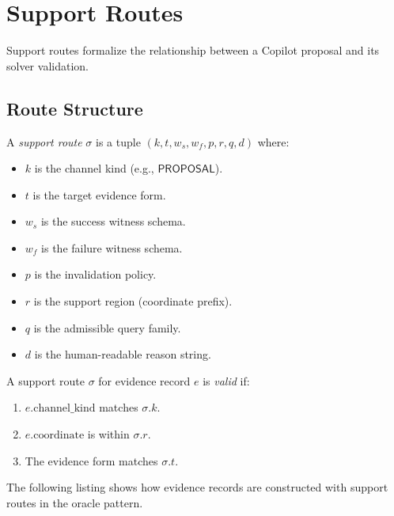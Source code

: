 \documentclass[11pt]{article}
\begin{document}
\section{Support Routes}
\label{sec:routes}

Support routes formalize the relationship between a Copilot
proposal and its solver validation.

\subsection{Route Structure}
\label{sec:routes:structure}

\begin{definition}
\label{def:support-route}
A \emph{support route} $\sigma$ is a tuple
$(k, t, w_s, w_f, p, r, q, d)$ where:
\begin{itemize}[leftmargin=2em]
\item $k$ is the channel kind (e.g., $\mathsf{PROPOSAL}$).
\item $t$ is the target evidence form.
\item $w_s$ is the success witness schema.
\item $w_f$ is the failure witness schema.
\item $p$ is the invalidation policy.
\item $r$ is the support region (coordinate prefix).
\item $q$ is the admissible query family.
\item $d$ is the human-readable reason string.
\end{itemize}
\end{definition}

\begin{definition}
\label{def:route-valid}
A support route $\sigma$ for evidence record $e$ is \emph{valid}
if:
\begin{enumerate}
\item $e.\mathrm{channel\_kind}$ matches $\sigma.k$.
\item $e.\mathrm{coordinate}$ is within $\sigma.r$.
\item The evidence form matches $\sigma.t$.
\end{enumerate}
\end{definition}

The following listing shows how evidence records are constructed
with support routes in the oracle pattern.
\end{document}
